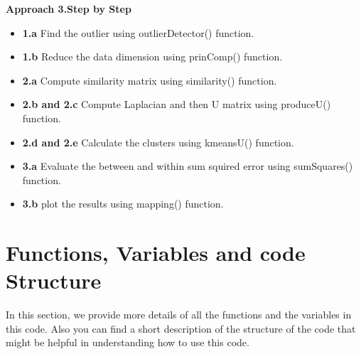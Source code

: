 \documentclass{article}
\begin{document}
{\bf Approach 3.Step by Step} \\
\begin{itemize}
\item {\bf 1.a } Find the outlier using outlierDetector() function.\\
\item {\bf 1.b} Reduce the data dimension using prinComp() function.\\
\item {\bf 2.a } Compute similarity matrix using similarity() function.\\
\item {\bf 2.b and 2.c} Compute Laplacian and then U matrix using produceU() function.\\
\item {\bf 2.d and 2.e} Calculate the clusters using kmeansU() function.\\
\item {\bf 3.a} Evaluate the between and within sum squired error using sumSquares() function.\\
\item {\bf 3.b} plot the results using mapping() function.\\
\end{itemize}
\begin{Schunk}
\end{Schunk}
\newpage
\section {Functions, Variables and code Structure}
In this section, we provide more details of all the functions and  the variables in this code. Also you can find a short description of the structure of the code  that might be helpful in understanding how to use this code.
\end{document}
